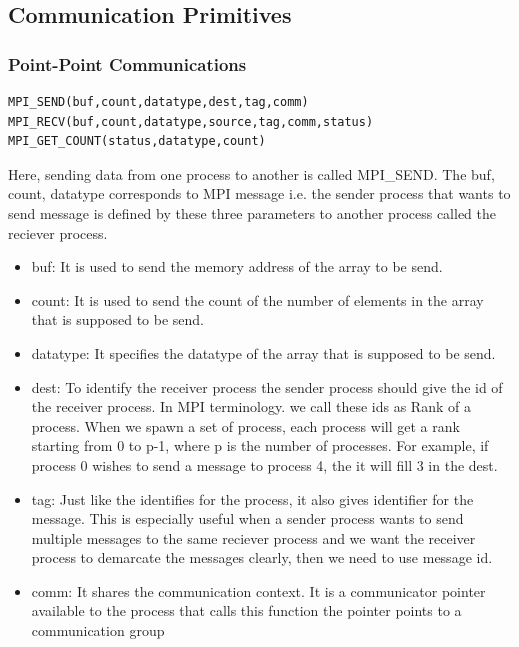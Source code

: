 \documentclass[12pt]{article}
\begin{document}
\subsection{Communication Primitives}
\subsubsection{Point-Point Communications}
\begin{lstlisting}
MPI_SEND(buf,count,datatype,dest,tag,comm)
MPI_RECV(buf,count,datatype,source,tag,comm,status)
MPI_GET_COUNT(status,datatype,count)
\end{lstlisting}
Here, sending data from one process to another is called MPI\_SEND.
The buf, count, datatype corresponds to MPI message i.e. the sender process that wants to send message is defined by these three parameters to another process called the reciever process. 
\begin{itemize}
    \item buf: It is used to send the memory address of the array to be send.
    \item count: It is used to send the count of the number of elements in the array that is supposed to be send.
    \item datatype: It specifies the datatype of the array that is supposed to be send.
    \item dest: To identify the receiver process the sender process should give the id of the receiver process. In MPI terminology. we call these ids as Rank of a process. When we spawn a set of process, each process will get a rank starting from 0 to p-1, where p is the number of processes. For example, if process 0 wishes to send a message to process 4, the it will fill 3 in the dest.
    \item tag: Just like the identifies for the process, it also gives identifier for the message. This is especially useful when a sender process wants to send multiple messages to the same reciever process and we want the receiver process to demarcate the messages clearly, then we need to use message id.
    \item comm: It shares the communication context. It is a communicator pointer available to the process that calls this function the pointer points to a communication group 
\end{itemize}
\end{document}
